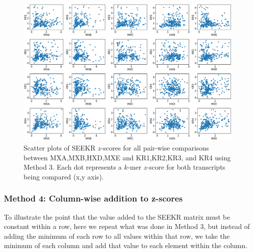 \begin{figure}[ht]
\centering
\includegraphics[width=.9\textwidth]{images/1_figs.pdf}
\caption[Row-wise minimum addition to $z$-score scatter plots]{Scatter plots of SEEKR $z$-scores for all pair-wise comparisons between MXA,MXB,HXD,MXE and KR1,KR2,KR3, and KR4 using Method 3. Each dot represents a $k$-mer $z$-score for both transcripts being compared (x,y axis).}
\label{fig:rowscat}
\end{figure}


\subsubsection{Method 4: Column-wise addition to z-scores}

To illustrate the point that the value added to the SEEKR matrix must be constant within a row, here we repeat what was done in Method 3, but instead of adding the minimum of each row to all values within that row, we take the minimum of each column and add that value to each element within the column.


